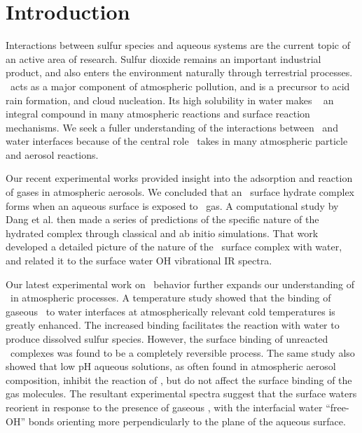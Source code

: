 \section{Introduction}

Interactions between sulfur species and aqueous systems are the current topic of an active area of research. Sulfur dioxide remains an important industrial product, and also enters the environment naturally through terrestrial processes. \suldiox~acts as a major component of atmospheric pollution, and is a precursor to acid rain formation, and cloud nucleation. Its high solubility in water makes \suldiox~ an integral compound in many atmospheric reactions and surface reaction mechanisms. We seek a fuller understanding of the interactions between \suldiox~and water interfaces because of the central role \suldiox~takes in many atmospheric particle and aerosol reactions.

Our recent experimental works provided insight into the adsorption and reaction of gases in atmospheric aerosols.\cite{Ota2011} We concluded that an \suldiox~surface hydrate complex forms when an aqueous surface is exposed to \suldiox~gas. A computational study by Dang et al.\cite{Baer2010} then made a series of predictions of the specific nature of the hydrated complex through classical and ab initio simulations. That work developed a detailed picture of the nature of the \suldiox~surface complex with water, and related it to the surface water OH vibrational IR spectra.

Our latest experimental work on \suldiox~behavior further expands our understanding of \suldiox~in atmospheric processes.\cite{Ota2011} A temperature study showed that the binding of gaseous \suldiox~to water interfaces at atmospherically relevant cold temperatures is greatly enhanced. The increased binding facilitates the reaction with water to produce dissolved sulfur species. However, the surface binding of unreacted \suldiox~complexes was found to be a completely reversible process. The same study also showed that low pH aqueous solutions, as often found in atmospheric aerosol composition, inhibit the reaction of \suldiox, but do not affect the surface binding of the gas molecules. The resultant experimental spectra suggest that the surface waters reorient in response to the presence of gaseous \suldiox, with the interfacial water ``free-OH'' bonds orienting more perpendicularly to the plane of the aqueous surface. 

